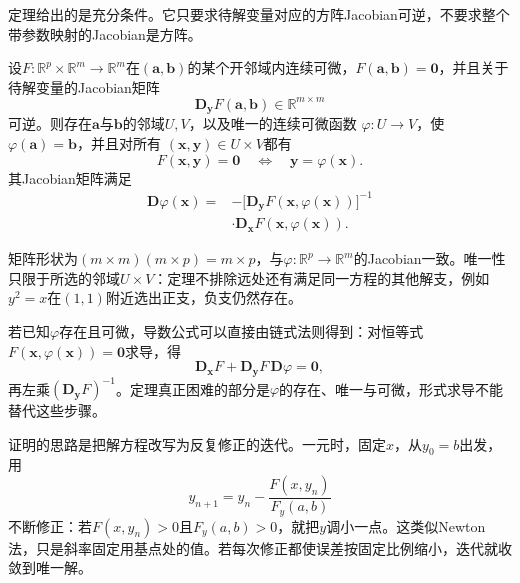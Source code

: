 定理给出的是充分条件。它只要求待解变量对应的方阵Jacobian可逆，不要求整个带参数映射的Jacobian是方阵。
\begin{theorem}[隐函数定理]
\label{thm:analysis-implicit-function}
设$F:\mathbb{R}^p\times\mathbb{R}^m\to\mathbb{R}^m$在$(\bm{a},\bm{b})$的某个开邻域内连续可微，$F(\bm{a},\bm{b})=\bm{0}$，并且关于待解变量的Jacobian矩阵
\[
 \bm{D}_{\bm{y}}F(\bm{a},\bm{b})\in\mathbb{R}^{m\times m}
\]
可逆。则存在$\bm{a}$与$\bm{b}$的邻域$U,V$，以及唯一的连续可微函数
$\varphi:U\to V$，使$\varphi(\bm{a})=\bm{b}$，并且对所有
$(\bm{x},\bm{y})\in U\times V$都有
\[
  F(\bm{x},\bm{y})=\bm{0}
  \quad\Longleftrightarrow\quad
  \bm{y}=\varphi(\bm{x}).
\]
其Jacobian矩阵满足
\begin{equation}
  \begin{aligned}
  \bm{D}\varphi(\bm{x})
  ={}&-\bigl[\bm{D}_{\bm{y}}F(\bm{x},\varphi(\bm{x}))\bigr]^{-1}\\
  &\cdot\bm{D}_{\bm{x}}F(\bm{x},\varphi(\bm{x})).
  \end{aligned}
\label{eq:analysis-implicit-derivative}
\end{equation}
\end{theorem}
矩阵形状为$(m\times m)(m\times p)=m\times p$，与$\varphi:\mathbb R^p\to\mathbb R^m$的Jacobian一致。唯一性只限于所选的邻域$U\times V$：定理不排除远处还有满足同一方程的其他解支，例如$y^2=x$在$(1,1)$附近选出正支，负支仍然存在。

若已知$\varphi$存在且可微，导数公式可以直接由链式法则得到：对恒等式$F(\bm x,\varphi(\bm x))=\bm 0$求导，得
\[
 \bm D_{\bm x}F+\bm D_{\bm y}F\,\bm D\varphi=\bm 0,
\]
再左乘$(\bm D_{\bm y}F)^{-1}$。定理真正困难的部分是$\varphi$的存在、唯一与可微，形式求导不能替代这些步骤。

证明的思路是把解方程改写为反复修正的迭代。一元时，固定$x$，从$y_0=b$出发，用
\[
 y_{n+1}=y_n-\frac{F(x,y_n)}{F_y(a,b)}
\]
不断修正：若$F(x,y_n)>0$且$F_y(a,b)>0$，就把$y$调小一点。这类似Newton法，只是斜率固定用基点处的值。若每次修正都使误差按固定比例缩小，迭代就收敛到唯一解。

